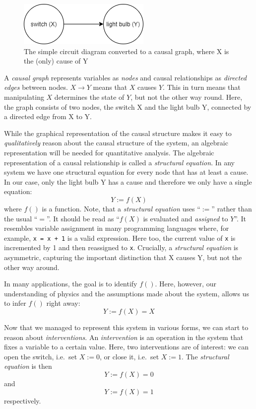 \documentclass[
]{book}
\theoremstyle{definition}
\theoremstyle{definition}
\theoremstyle{definition}
\theoremstyle{remark}
\begin{document}
\begin{figure}
\centering
\includegraphics{images/causal_models-dag_simple_environment.png}
\caption{The simple circuit diagram converted to a causal graph, where X is the (only) cause of Y}
\end{figure}

A \emph{causal graph} represents variables as \emph{nodes} and causal relationships as \emph{directed edges} between nodes. \(X \rightarrow Y\) means that \(X\) causes \(Y\). This in turn means that manipulating \(X\) determines the state of \(Y\), but not the other way round. Here, the graph consists of two nodes, the switch X and the light bulb Y, connected by a directed edge from X to Y.

While the graphical representation of the causal structure makes it easy to \emph{qualitatively} reason about the causal structure of the system, an algebraic representation will be needed for quantitative analysis. The algebraic representation of a causal relationship is called a \emph{structural equation}. In any system we have one structural equation for every node that has at least a cause.
In our case, only the light bulb Y has a cause and therefore we only have a single equation:
\begin{equation}
Y := f(X)
\end{equation}
where \(f()\) is a function.
Note, that a \emph{structural equation} uses ``\(:=\)'' rather than the usual ``\(=\)''. It should be read as ``\(f(X)\) is evaluated and \emph{assigned} to \(Y\)''. It resembles variable assignment in many programming languages where, for example, \texttt{x\ =\ x\ +\ 1} is a valid expression. Here too, the current value of \texttt{x} is incremented by 1 and then reassigned to \texttt{x}. Crucially, a \emph{structural equation} is asymmetric, capturing the important distinction that X causes Y, but not the other way around.

In many applications, the goal is to identify \(f()\). Here, however, our understanding of physics and the assumptions made about the system, allows us to infer \(f()\) right away:
\begin{equation}
Y := f(X) = X
\end{equation}

Now that we managed to represent this system in various forms, we can start to reason about \emph{interventions}. An \emph{intervention} is an operation in the system that fixes a variable to a certain value. Here, two interventions are of interest: we can open the switch, i.e.~set \(X:=0\), or close it, i.e.~set \(X:=1\). The \emph{structural equation} is then
\begin{equation}
Y := f(X) = 0
\end{equation}
and
\begin{equation}
Y := f(X) = 1
\end{equation}
respectively.
\end{document}
